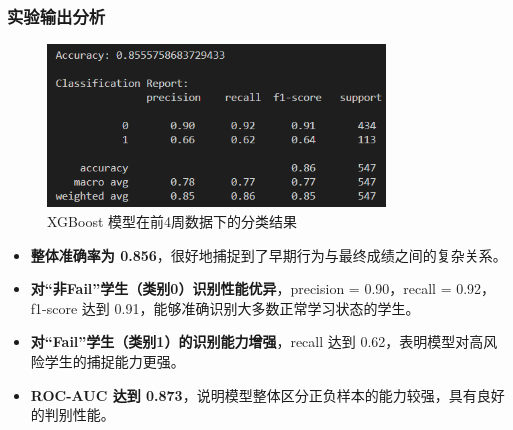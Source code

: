 \documentclass{SYSUReport}
\begin{document}
\subsubsection{实验输出分析}

\begin{figure}[htbp]
    \centering
    \includegraphics[width=0.8\textwidth]{figures/XGBoost_result.png}
    \caption{XGBoost 模型在前4周数据下的分类结果}
    \label{fig:xgboost_result}
\end{figure}

\begin{itemize}
    \item \textbf{整体准确率为 0.856}，很好地捕捉到了早期行为与最终成绩之间的复杂关系。
    \item \textbf{对“非Fail”学生（类别0）识别性能优异}，precision = 0.90，recall = 0.92，f1-score 达到 0.91，能够准确识别大多数正常学习状态的学生。
    \item \textbf{对“Fail”学生（类别1）的识别能力增强}，recall 达到 0.62，表明模型对高风险学生的捕捉能力更强。
    \item \textbf{ROC-AUC 达到 0.873}，说明模型整体区分正负样本的能力较强，具有良好的判别性能。
\end{itemize}
\end{document}
